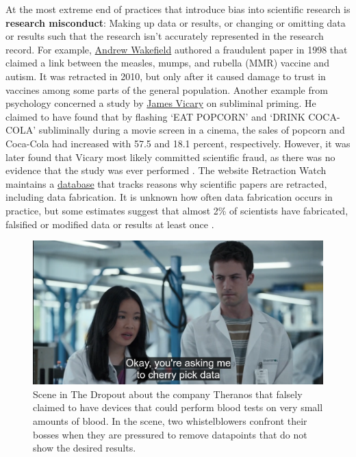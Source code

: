 \documentclass[
  oneside]{krantz}
\begin{document}
At the most extreme end of practices that introduce bias into scientific research is \textbf{research misconduct}: Making up data or results, or changing or omitting data or results such that the research isn't accurately represented in the research record. For example, \href{https://en.wikipedia.org/wiki/Andrew_Wakefield}{Andrew Wakefield} authored a fraudulent paper in 1998 that claimed a link between the measles, mumps, and rubella (MMR) vaccine and autism. It was retracted in 2010, but only after it caused damage to trust in vaccines among some parts of the general population. Another example from psychology concerned a study by \href{https://en.wikipedia.org/wiki/James_Vicary}{James Vicary} on subliminal priming. He claimed to have found that by flashing `EAT POPCORN' and `DRINK COCA-COLA' subliminally during a movie screen in a cinema, the sales of popcorn and Coca-Cola had increased with 57.5 and 18.1 percent, respectively. However, it was later found that Vicary most likely committed scientific fraud, as there was no evidence that the study was ever performed \citep{rogers_how_1992}. The website Retraction Watch maintains a \href{http://retractiondatabase.org}{database} that tracks reasons why scientific papers are retracted, including data fabrication. It is unknown how often data fabrication occurs in practice, but some estimates suggest that almost 2\% of scientists have fabricated, falsified or modified data or results at least once \citep{fanelli_how_2009}.



\begin{figure}

{\centering \includegraphics[width=1\linewidth]{images/dropout_outlier} 

}

\caption{Scene in The Dropout about the company Theranos that falsely claimed to have devices that could perform blood tests on very small amounts of blood. In the scene, two whistelblowers confront their bosses when they are pressured to remove datapoints that do not show the desired results.}\label{fig:outliers}
\end{figure}
\end{document}
